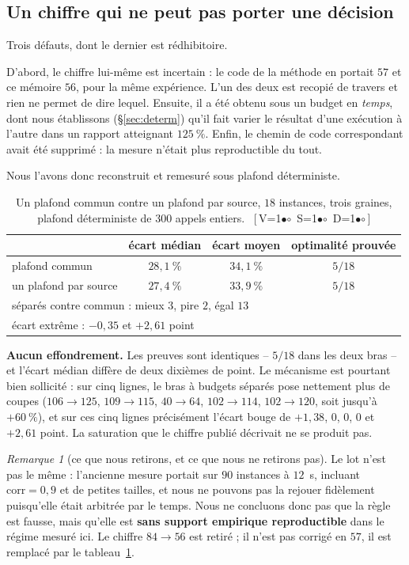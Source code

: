 \documentclass[11pt,a4paper]{article}
\theoremstyle{plain}
\theoremstyle{remark}
\newtheorem{remark}{Remarque}
\newcommand{\cfgm}[1]{\ifnum#1=1$\bullet$\else$\circ$\fi}
\newcommand{\conf}[3]{%
  \textsf{\footnotesize[\,V\cfgm{#1}\ S\cfgm{#2}\ D\cfgm{#3}\,]}}
\begin{document}
\subsection{Un chiffre qui ne peut pas porter une décision}

Trois défauts, dont le dernier est rédhibitoire.

D'abord, le chiffre lui-même est incertain : le code de la méthode en
portait $57$ et ce mémoire $56$, pour la même expérience. L'un des deux est
recopié de travers et rien ne permet de dire lequel. Ensuite, il a été
obtenu sous un budget en \emph{temps}, dont nous établissons
(§\ref{sec:determ}) qu'il fait varier le résultat d'une exécution à l'autre
dans un rapport atteignant $125\ \%$. Enfin, le chemin de code
correspondant avait été supprimé : la mesure n'était plus reproductible du
tout.

Nous l'avons donc reconstruit et remesuré sous plafond déterministe.

\begin{table}[H]
\centering
\caption{Un plafond commun contre un plafond par source, $18$ instances,
trois graines, plafond déterministe de $300$ appels entiers.\
\conf{1}{1}{1}}
\label{tab:budgets}
\begin{tabular}{lccc}
\toprule
& écart médian & écart moyen & optimalité prouvée\\
\midrule
plafond commun & $28{,}1\ \%$ & $34{,}1\ \%$ & $5/18$\\
un plafond par source & $27{,}4\ \%$ & $33{,}9\ \%$ & $5/18$\\
\midrule
\multicolumn{4}{l}{séparés contre commun : mieux $3$, pire $2$, égal $13$}\\
\multicolumn{4}{l}{écart extrême : $-0{,}35$ et $+2{,}61$ point}\\
\bottomrule
\end{tabular}
\end{table}

\noindent
\textbf{Aucun effondrement.} Les preuves sont identiques -- $5/18$ dans les
deux bras -- et l'écart médian diffère de deux dixièmes de point. Le
mécanisme est pourtant bien sollicité : sur cinq lignes, le bras à budgets
séparés pose nettement plus de coupes ($106\!\to\!125$, $109\!\to\!115$,
$40\!\to\!64$, $102\!\to\!114$, $102\!\to\!120$, soit jusqu'à $+60\ \%$), et
sur ces cinq lignes précisément l'écart bouge de $+1{,}38$, $0$, $0$, $0$ et
$+2{,}61$ point. La saturation que le chiffre publié décrivait ne se produit
pas.

\begin{remark}[ce que nous retirons, et ce que nous ne retirons pas]
Le lot n'est pas le même : l'ancienne mesure portait sur $90$ instances à
$12$~s, incluant $\text{corr}=0{,}9$ et de petites tailles, et nous ne
pouvons pas la rejouer fidèlement puisqu'elle était arbitrée par le temps.
Nous ne concluons donc pas que la règle est fausse, mais qu'elle est
\textbf{sans support empirique reproductible} dans le régime mesuré ici. Le
chiffre $84\to 56$ est retiré ; il n'est pas corrigé en $57$, il est
remplacé par le tableau~\ref{tab:budgets}.
\end{remark}
\end{document}
